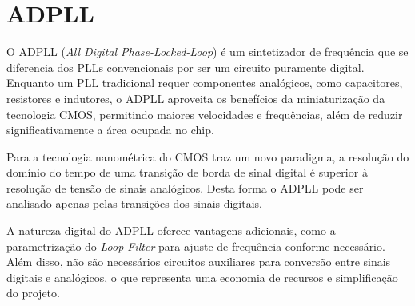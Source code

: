 \section{ADPLL}
%


O ADPLL (\textit{All Digital Phase-Locked-Loop}) é um sintetizador de frequência que se diferencia dos PLLs convencionais por ser um circuito puramente digital. Enquanto um PLL tradicional requer componentes analógicos, como capacitores, resistores e indutores, o ADPLL aproveita os benefícios da miniaturização da tecnologia CMOS, permitindo maiores velocidades e frequências, além de reduzir significativamente a área ocupada no chip.

Para \cite{staszewski2006all} a tecnologia nanométrica do CMOS traz um novo paradigma, a resolução do domínio do tempo de uma transição de borda de sinal digital é superior à resolução de tensão de sinais analógicos. Desta forma o ADPLL pode ser analisado apenas pelas transições dos sinais digitais.

A natureza digital do ADPLL oferece vantagens adicionais, como a parametrização do \textit{Loop-Filter} para ajuste de frequência conforme necessário. Além disso, não são necessários circuitos auxiliares para conversão entre sinais digitais e analógicos, o que representa uma economia de recursos e simplificação do projeto.


